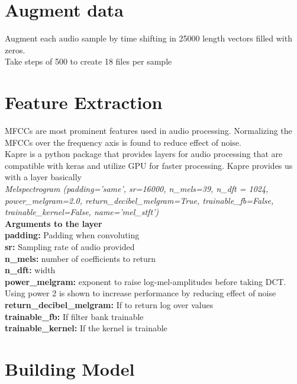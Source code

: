 \documentclass[11pt,english]{article}
\begin{document}
\section{Augment data}
Augment each audio sample by time shifting in 25000 length vectors filled with zeros. \\
Take steps of 500 to create 18 files per sample

\section{Feature Extraction}
MFCCs are most prominent features used in audio processing.
Normalizing the MFCCs over the frequency axis is found to reduce effect of noise.\\
Kapre is a python package that provides layers for audio processing that are compatible with keras and utilize GPU for faster processing. Kapre provides us with a layer basically\\

\textit{Melspectrogram (padding='same', sr=16000, n\_mels=39, n\_dft = 1024, power\_melgram=2.0, return\_decibel\_melgram=True, trainable\_fb=False, trainable\_kernel=False,  name='mel\_stft')}\\

\textbf{Arguments to the layer}\\
\textbf{padding:} Padding when convoluting\\
\textbf{sr:} Sampling rate of audio provided\\
\textbf{n\_mels:} number of coefficients to return\\
\textbf{n\_dft:} width \\
\textbf{power\_melgram:} exponent to raise log-mel-amplitudes before taking DCT. Using power 2 is shown to increase performance by reducing effect of noise\\
\textbf{return\_decibel\_melgram:} If to return log over values\\
\textbf{trainable\_fb:} If filter bank trainable\\
\textbf{trainable\_kernel:} If the kernel is trainable

\section{Building Model}
\end{document}
